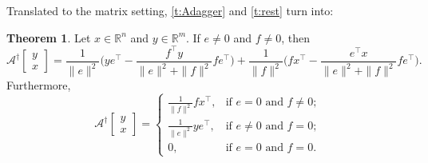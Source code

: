 \documentclass[12pt]{article}
\newcommand{\RR}{\ensuremath{\mathbb R}}
\theoremstyle{definition}
\newtheorem{theorem}{Theorem}[section]
\providecommand{\RR}{\mathbb{R}}
\providecommand{\RR}{\mathbb{R}}
\begin{document}
{Translated to the matrix setting,
\cref{t:Adagger} and \cref{t:rest} turn into:
\begin{theorem}
Let $x\in\RR^n$ and $y\in\RR^m$. 
If $e\neq 0$ and $f\neq 0$, then 
\begin{equation}
\mathcal{A}^\dagger
\begin{bmatrix} y \\ x \end{bmatrix}
= 
\frac{1}{\|e\|^2}\Big( ye^\intercal - 
\frac{{f}^\intercal{{y}}}{\|e\|^2+\|f\|^2} f e^\intercal\Big) + 
\frac{1}{\|f\|^2}\Big( f x^\intercal - 
\frac{{e}^\intercal{x}}{\|e\|^2+\|f\|^2} f e^\intercal\Big). 
\end{equation}
Furthermore, 
\begin{equation}
\mathcal{A}^\dagger
\begin{bmatrix} y \\ x \end{bmatrix}
=
\begin{cases}
\displaystyle \frac{1}{\|f\|^2}fx^\intercal,
&\text{if $e=0$ and $f\neq 0$;}\\[+4mm]
\displaystyle \frac{1}{\|e\|^2}ye^\intercal,
&\text{if $e\neq 0$ and $f=0$;}\\[+4mm]
0,
&\text{if $e=0$ and $f=0$.}
\end{cases}
\end{equation}
\end{theorem}

}
\end{document}
